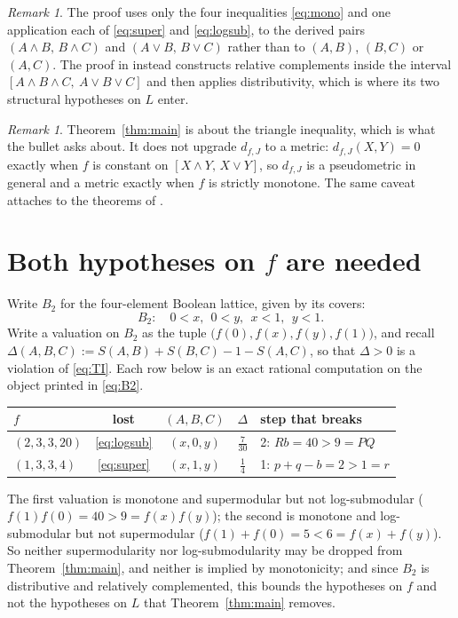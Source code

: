 \documentclass[11pt]{amsart}
\theoremstyle{remark}
\newtheorem{remark}[theorem]{Remark}
\newcommand{\Lat}{L}
\newcommand{\dJ}{d_{f,J}}
\begin{document}
\begin{remark}\sloppy
The proof uses only the four inequalities \eqref{eq:mono} and one application
each of \eqref{eq:super} and \eqref{eq:logsub}, to the derived pairs
$(A\wedge B,\,B\wedge C)$ and $(A\vee B,\,B\vee C)$ rather than to $(A,B)$,
$(B,C)$ or $(A,C)$. The proof in \cite{BB} instead constructs relative
complements inside the interval $[A\wedge B\wedge C,\ A\vee B\vee C]$ and then
applies distributivity, which is where its two structural hypotheses on $\Lat$
enter.
\end{remark}

\begin{remark}\label{rem:pseudo}
Theorem~\ref{thm:main} is about the triangle inequality, which is what the
bullet asks about. It does not upgrade $\dJ$ to a metric: $\dJ(X,Y)=0$ exactly
when $f$ is constant on $[X\wedge Y,\,X\vee Y]$, so $\dJ$ is a pseudometric in
general and a metric exactly when $f$ is strictly monotone. The same caveat
attaches to the theorems of \cite{BB}.
\end{remark}

\section{Both hypotheses on $f$ are needed}

Write $B_2$ for the four-element Boolean lattice, given by its covers:
\begin{equation}\label{eq:B2}
 B_2:\quad 0<x,\ \ 0<y,\ \ x<1,\ \ y<1 .
\end{equation}
Write a valuation on $B_2$ as the tuple $\bigl(f(0),f(x),f(y),f(1)\bigr)$, and
recall $\Delta(A,B,C):=S(A,B)+S(B,C)-1-S(A,C)$, so that $\Delta>0$ is a
violation of \eqref{eq:TI}. Each row below is an exact rational computation on
the object printed in \eqref{eq:B2}.
\begin{center}
\begin{tabular}{lcccl}
$f$ & lost & $(A,B,C)$ & $\Delta$ & step that breaks\\
\hline
$(2,3,3,20)$ & \eqref{eq:logsub} & $(x,0,y)$ & $\tfrac{7}{30}$ & 2:
 $Rb=40>9=PQ$\\
$(1,3,3,4)$  & \eqref{eq:super}  & $(x,1,y)$ & $\tfrac14$ & 1:
 $p+q-b=2>1=r$
\end{tabular}
\end{center}
The first valuation is monotone and supermodular but not log-submodular
($f(1)f(0)=40>9=f(x)f(y)$); the second is monotone and log-submodular but not
supermodular ($f(1)+f(0)=5<6=f(x)+f(y)$). So neither supermodularity nor
log-submodularity may be dropped from Theorem~\ref{thm:main}, and neither is
implied by monotonicity; and since $B_2$ is distributive and relatively
complemented, this bounds the hypotheses on $f$ and not the hypotheses on
$\Lat$ that Theorem~\ref{thm:main} removes.
\end{document}
